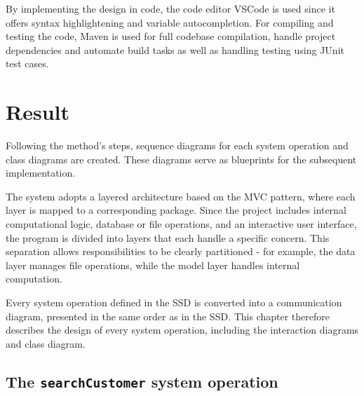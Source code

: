 \documentclass[a4paper]{scrartcl}
\begin{document}
By implementing the design in code, the code editor VSCode is used since it offers syntax highlightening and variable autocompletion. For compiling and testing the code, Maven is used for full codebase compilation, handle project dependencies and automate build tasks as well as handling testing using JUnit test cases.


\section{Result}
\label{sec:result}


Following the method's steps, sequence diagrams for each system operation and class diagrams are created. These diagrams serve as blueprints for the subsequent implementation.

The system adopts a layered architecture based on the MVC pattern, where each layer is mapped to a corresponding package. Since the project includes internal computational logic, database or file operations, and an interactive user interface, the program is divided into layers that each handle a specific concern. This separation allows responsibilities to be clearly partitioned - for example, the data layer manages file operations, while the model layer handles internal computation.

Every system operation defined in the SSD is converted into a communication diagram, presented in the same order as in the SSD. This chapter therefore describes the design of every system operation, including the interaction diagrams and class diagram.

\subsection{The \texttt{searchCustomer} system operation}
\end{document}
